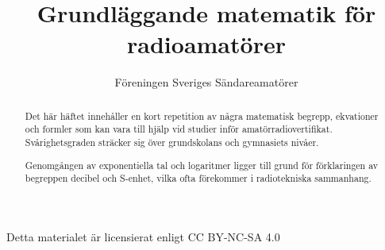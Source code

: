 \documentclass[a4paper]{article}
\begin{document}
\title{Grundläggande matematik för radioamatörer}
\author{Föreningen Sveriges Sändareamatörer}

\maketitle

Detta materialet är licensierat enligt CC BY-NC-SA 4.0

\begin{abstract}
  Det här häftet innehåller en kort repetition av några matematisk begrepp,
  ekvationer och formler som kan vara till hjälp vid studier inför
  amatörradiovertifikat. Svårighetsgraden sträcker sig över grundskolans
  och gymnasiets nivåer.

  Genomgången av exponentiella tal och logaritmer ligger till grund för
  förklaringen av begreppen decibel och S-enhet, vilka ofta förekommer i
  radiotekniska sammanhang.
\end{abstract}


\end{document}
